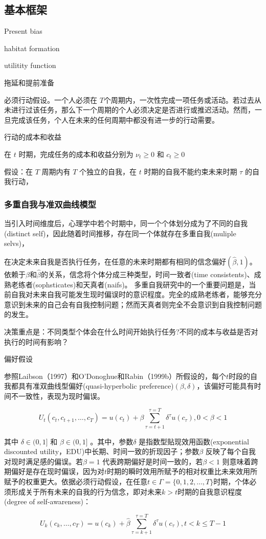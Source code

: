 \subsection{基本框架}

Present bias

habitat formation

utilitity function 

拖延和提前准备

必须行动假设。一个人必须在 $T$个周期内，一次性完成一项任务或活动。若过去从未进行过该任务，那么下一个周期的个人必须决定是否进行或推迟活动。然而，一旦完成该任务，个人在未来的任何周期中都没有进一步的行动需要。

行动的成本和收益

在 $t$ 时期，完成任务的成本和收益分别为 $\nu_t \geq 0$ 和 $c_t \geq 0$

假设：在 $T$ 周期内有 $T$ 个独立的自我，在 $t$ 时期的自我不能约束未来时期 $\tau$ 的自我行动，


\subsubsection{多重自我与准双曲线模型}

当引入时间维度后，心理学中若个时期中，同一个个体划分成为了不同的自我(distinct self)，因此随着时间推移，存在同一个体就存在多重自我(muliple selvs)，


在决定未来自我是否执行任务，在任意的未来时期都有相同的信念偏好$(\hat\beta,1)$。依赖于$\beta$和$\hat\beta$的关系，信念将个体分成三种类型，时间一致者(time consistents)、成熟老练者(sophsticates)和天真者(naifs)。
多重自我研究中的一个重要问题是，当前自我对未来自我可能发生现时偏误时的意识程度。完全的成熟老练者，能够充分意识到未来的自己会有自我控制问题；然而天真者则完全不会意识到自我控制问题的发生。

决策重点是：不同类型个体会在什么时间开始执行任务?不同的成本与收益是否对执行的时间有影响？


偏好假设

参照Laibson（1997）和O'Donoghue和Rabin（1999b）所假设的，每个$t$时段的自我都具有准双曲线型偏好(quasi-hyperbolic preference)$(\beta , \delta)$，该偏好可能具有时间不一致性，表现为现时偏误。

$$U_t\left(c_t, c_{t+1}, \ldots, c_T\right)=u\left(c_t\right)+\beta \sum_{\tau=t+1}^{\tau=T} \delta^\tau u\left(c_\tau\right), 0<\beta<1$$

其中 $\delta \in(0,1]$ 和 $\beta \in(0,1]$ 。其中，参数$\delta$ 是指数型贴现效用函数(exponential discounted utility，EDU)中长期、时间一致的折现因子；参数$\beta$ 反映了每个自我对现时满足感的偏误。若$\beta = 1$ 代表跨期偏好是时间一致的，若$\beta < 1$ 则意味着跨期偏好是存在现时偏误，因为对$t$时期的瞬时效用所赋予的相对权重比未来效用所赋予的权重更大。依据必须行动假设，在任意$t \in \Gamma=\{0,1,2, \ldots, T\}$时期，个体必须形成关于所有未来的自我的行为信念，即对未来$k>t$时期的自我意识程度(degree of  self-awareness)：

$$U_k\left(c_k, \ldots, c_T\right)=u\left(c_k\right)+\widehat{\beta} \sum_{\tau=k+1}^{\tau=T} \delta^\tau u\left(c_\tau\right), t<k \leq T-1$$








